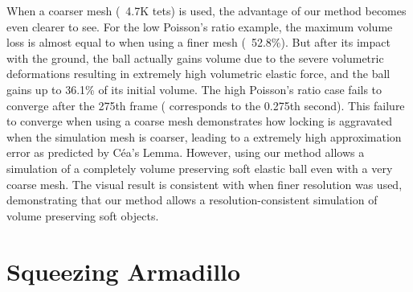 When a coarser mesh (~4.7K tets) is used, the advantage of our method becomes even clearer to see. For the low Poisson's ratio example, the maximum volume loss is almost equal to when using a finer mesh (~52.8\%). But after its impact with the ground, the ball actually gains volume due to the severe volumetric deformations resulting in extremely high volumetric elastic force, and the ball gains up to 36.1\% of its initial volume. The high Poisson's ratio case fails to converge after the 275th frame ( corresponds to the 0.275th second). This failure to converge when using a coarse mesh demonstrates how locking is aggravated when the simulation mesh is coarser, leading to a extremely high approximation error as predicted by C\'ea's Lemma. However, using our method allows a simulation of a completely volume preserving soft elastic ball even with a very coarse mesh. The visual result is consistent with when finer resolution was used, demonstrating that our method allows a resolution-consistent simulation of volume preserving soft objects. 

\section{Squeezing Armadillo}

